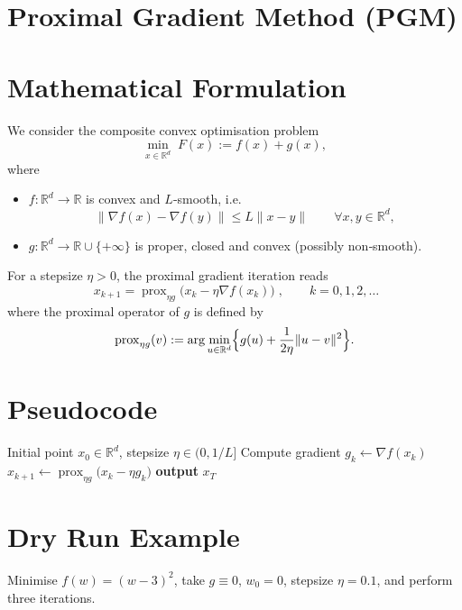 \documentclass{article}
\newcommand{\prox}{\operatorname{prox}}
\newcommand{\R}{\mathbb{R}}
\begin{document}
\section*{Proximal Gradient Method (PGM)}

\section*{Mathematical Formulation}
We consider the composite convex optimisation problem  
\[
\min_{x\in\R^{d}} \;F(x):=f(x)+g(x),
\]
where  

\begin{itemize}[noitemsep]
\item $f:\R^{d}\!\to\!\R$ is convex and $L$‑smooth, i.e.  
\[
\|\nabla f(x)-\nabla f(y)\|\le L\|x-y\|\qquad\forall x,y\in\R^{d},
\]
\item $g:\R^{d}\!\to\!\R\cup\{+\infty\}$ is proper, closed and convex (possibly non‑smooth).
\end{itemize}

For a stepsize $\eta>0$, the proximal gradient iteration reads
\begin{equation}
\boxed{\;x_{k+1}= \prox_{\eta g}\!\bigl(x_{k}-\eta \nabla f(x_{k})\bigr)\;},
\qquad k=0,1,2,\dots
\tag{1}
\end{equation}
where the proximal operator of $g$ is defined by  
\[
\prox_{\eta g}(v):=\arg\min_{u\in\R^{d}}
\Bigl\{ g(u)+\frac{1}{2\eta}\|u-v\|^{2}\Bigr\}.
\]

\section*{Pseudocode}
\begin{algorithm}[H]
\caption{Proximal Gradient Method}
\begin{algorithmic}[1]
\Require Initial point $x_{0}\in\R^{d}$, stepsize $\eta\in(0,1/L]$
    \State Compute gradient $g_{k}\gets\nabla f(x_{k})$
    \State $x_{k+1}\gets \prox_{\eta g}\!\bigl(x_{k}-\eta g_{k}\bigr)$
\EndFor
\State \textbf{output} $x_{T}$
\end{algorithmic}
\end{algorithm}

\section*{Dry Run Example}
Minimise $f(w)=(w-3)^{2}$, take $g\equiv0$, $w_{0}=0$, stepsize $\eta=0.1$, and perform three iterations.
\end{document}
